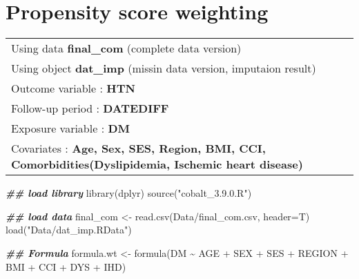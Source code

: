 \documentclass[
]{book}
\newenvironment{Shaded}{\begin{snugshade}}{\end{snugshade}}
\newcommand{\AttributeTok}[1]{\textcolor[rgb]{0.77,0.63,0.00}{#1}}
\newcommand{\DocumentationTok}[1]{\textcolor[rgb]{0.56,0.35,0.01}{\textbf{\textit{#1}}}}
\newcommand{\FunctionTok}[1]{\textcolor[rgb]{0.00,0.00,0.00}{#1}}
\newcommand{\NormalTok}[1]{#1}
\newcommand{\OtherTok}[1]{\textcolor[rgb]{0.56,0.35,0.01}{#1}}
\newcommand{\SpecialCharTok}[1]{\textcolor[rgb]{0.00,0.00,0.00}{#1}}
\newcommand{\StringTok}[1]{\textcolor[rgb]{0.31,0.60,0.02}{#1}}
\theoremstyle{definition}
\theoremstyle{definition}
\theoremstyle{definition}
\theoremstyle{definition}
\theoremstyle{remark}
\begin{document}
\hypertarget{propensity-score-weighting}{%
\chapter{Propensity score weighting}\label{propensity-score-weighting}}

\begin{longtable}[]{@{}l@{}}
\toprule()
\endhead
Using data \textbf{final\_com} (complete data version) \\
Using object \textbf{dat\_imp} (missin data version, imputaion result) \\
Outcome variable : \textbf{HTN} \\
Follow-up period : \textbf{DATEDIFF} \\
Exposure variable : \textbf{DM} \\
Covariates : \textbf{Age, Sex, SES, Region, BMI, CCI, Comorbidities(Dyslipidemia, Ischemic heart disease)} \\
\bottomrule()
\end{longtable}

\begin{Shaded}
\begin{Highlighting}[]
\DocumentationTok{\#\# load library}
\FunctionTok{library}\NormalTok{(dplyr)}
\FunctionTok{source}\NormalTok{(}\StringTok{"cobalt\_3.9.0.R"}\NormalTok{)}
\end{Highlighting}
\end{Shaded}

\begin{Shaded}
\begin{Highlighting}[]
\DocumentationTok{\#\# load data}
\NormalTok{final\_com }\OtherTok{\textless{}{-}} \FunctionTok{read.csv}\NormalTok{(}\StringTok{\textquotesingle{}Data/final\_com.csv\textquotesingle{}}\NormalTok{, }\AttributeTok{header=}\NormalTok{T)}
\FunctionTok{load}\NormalTok{(}\StringTok{"Data/dat\_imp.RData"}\NormalTok{)}
\end{Highlighting}
\end{Shaded}

\begin{Shaded}
\begin{Highlighting}[]
\DocumentationTok{\#\# Formula}
\NormalTok{formula.wt }\OtherTok{\textless{}{-}} \FunctionTok{formula}\NormalTok{(DM }\SpecialCharTok{\textasciitilde{}}\NormalTok{ AGE }\SpecialCharTok{+}\NormalTok{ SEX }\SpecialCharTok{+}\NormalTok{ SES }\SpecialCharTok{+}\NormalTok{ REGION }\SpecialCharTok{+}\NormalTok{ BMI }\SpecialCharTok{+}\NormalTok{ CCI }\SpecialCharTok{+}\NormalTok{ DYS }\SpecialCharTok{+}\NormalTok{ IHD)}
\end{Highlighting}
\end{Shaded}
\end{document}
